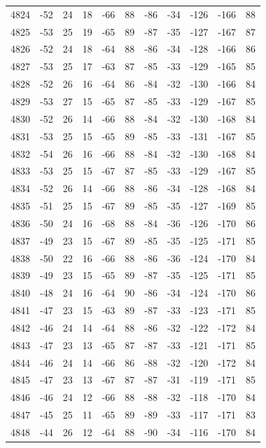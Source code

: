 \begin{table}[H]
\begin{tabular}{lllllllllll}
4824 & -52 & 24 & 18 & -66 & 88 & -86 & -34 & -126 & -166 & 88 \\
4825 & -53 & 25 & 19 & -65 & 89 & -87 & -35 & -127 & -167 & 87 \\
4826 & -52 & 24 & 18 & -64 & 88 & -86 & -34 & -128 & -166 & 86 \\
4827 & -53 & 25 & 17 & -63 & 87 & -85 & -33 & -129 & -165 & 85 \\
4828 & -52 & 26 & 16 & -64 & 86 & -84 & -32 & -130 & -166 & 84 \\
4829 & -53 & 27 & 15 & -65 & 87 & -85 & -33 & -129 & -167 & 85 \\
4830 & -52 & 26 & 14 & -66 & 88 & -84 & -32 & -130 & -168 & 84 \\
4831 & -53 & 25 & 15 & -65 & 89 & -85 & -33 & -131 & -167 & 85 \\
4832 & -54 & 26 & 16 & -66 & 88 & -84 & -32 & -130 & -168 & 84 \\
4833 & -53 & 25 & 15 & -67 & 87 & -85 & -33 & -129 & -167 & 85 \\
4834 & -52 & 26 & 14 & -66 & 88 & -86 & -34 & -128 & -168 & 84 \\
4835 & -51 & 25 & 15 & -67 & 89 & -85 & -35 & -127 & -169 & 85 \\
4836 & -50 & 24 & 16 & -68 & 88 & -84 & -36 & -126 & -170 & 86 \\
4837 & -49 & 23 & 15 & -67 & 89 & -85 & -35 & -125 & -171 & 85 \\
4838 & -50 & 22 & 16 & -66 & 88 & -86 & -36 & -124 & -170 & 84 \\
4839 & -49 & 23 & 15 & -65 & 89 & -87 & -35 & -125 & -171 & 85 \\
4840 & -48 & 24 & 16 & -64 & 90 & -86 & -34 & -124 & -170 & 86 \\
4841 & -47 & 23 & 15 & -63 & 89 & -87 & -33 & -123 & -171 & 85 \\
4842 & -46 & 24 & 14 & -64 & 88 & -86 & -32 & -122 & -172 & 84 \\
4843 & -47 & 23 & 13 & -65 & 87 & -87 & -33 & -121 & -171 & 85 \\
4844 & -46 & 24 & 14 & -66 & 86 & -88 & -32 & -120 & -172 & 84 \\
4845 & -47 & 23 & 13 & -67 & 87 & -87 & -31 & -119 & -171 & 85 \\
4846 & -46 & 24 & 12 & -66 & 88 & -88 & -32 & -118 & -170 & 84 \\
4847 & -45 & 25 & 11 & -65 & 89 & -89 & -33 & -117 & -171 & 83 \\
4848 & -44 & 26 & 12 & -64 & 88 & -90 & -34 & -116 & -170 & 84 \\

\end{tabular}
\end{table}
